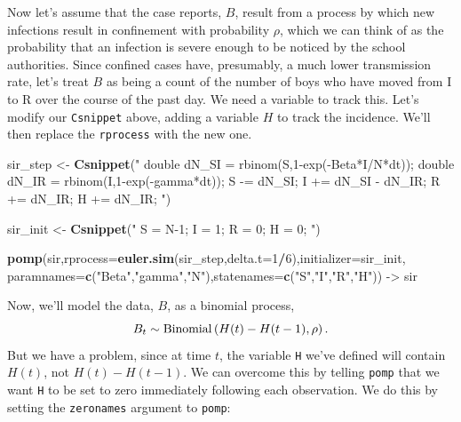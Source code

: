 \documentclass[]{article}
\newenvironment{Shaded}{\begin{snugshade}}{\end{snugshade}}
\newcommand{\KeywordTok}[1]{\textcolor[rgb]{0.13,0.29,0.53}{\textbf{#1}}}
\newcommand{\DataTypeTok}[1]{\textcolor[rgb]{0.13,0.29,0.53}{#1}}
\newcommand{\DecValTok}[1]{\textcolor[rgb]{0.00,0.00,0.81}{#1}}
\newcommand{\StringTok}[1]{\textcolor[rgb]{0.31,0.60,0.02}{#1}}
\newcommand{\OperatorTok}[1]{\textcolor[rgb]{0.81,0.36,0.00}{\textbf{#1}}}
\newcommand{\NormalTok}[1]{#1}
\begin{document}
Now let's assume that the case reports, \(B\), result from a process by
which new infections result in confinement with probability \(\rho\),
which we can think of as the probability that an infection is severe
enough to be noticed by the school authorities. Since confined cases
have, presumably, a much lower transmission rate, let's treat \(B\) as
being a count of the number of boys who have moved from I to R over the
course of the past day. We need a variable to track this. Let's modify
our \texttt{Csnippet} above, adding a variable \(H\) to track the
incidence. We'll then replace the \texttt{rprocess} with the new one.

\begin{Shaded}
\begin{Highlighting}[]
\NormalTok{sir_step <-}\StringTok{ }\KeywordTok{Csnippet}\NormalTok{(}\StringTok{"}
\StringTok{  double dN_SI = rbinom(S,1-exp(-Beta*I/N*dt));}
\StringTok{  double dN_IR = rbinom(I,1-exp(-gamma*dt));}
\StringTok{  S -= dN_SI;}
\StringTok{  I += dN_SI - dN_IR;}
\StringTok{  R += dN_IR;}
\StringTok{  H += dN_IR;}
\StringTok{"}\NormalTok{)}

\NormalTok{sir_init <-}\StringTok{ }\KeywordTok{Csnippet}\NormalTok{(}\StringTok{"}
\StringTok{  S = N-1;}
\StringTok{  I = 1;}
\StringTok{  R = 0;}
\StringTok{  H = 0;}
\StringTok{"}\NormalTok{)}

\KeywordTok{pomp}\NormalTok{(sir,}\DataTypeTok{rprocess=}\KeywordTok{euler.sim}\NormalTok{(sir_step,}\DataTypeTok{delta.t=}\DecValTok{1}\OperatorTok{/}\DecValTok{6}\NormalTok{),}\DataTypeTok{initializer=}\NormalTok{sir_init,}
     \DataTypeTok{paramnames=}\KeywordTok{c}\NormalTok{(}\StringTok{"Beta"}\NormalTok{,}\StringTok{"gamma"}\NormalTok{,}\StringTok{"N"}\NormalTok{),}\DataTypeTok{statenames=}\KeywordTok{c}\NormalTok{(}\StringTok{"S"}\NormalTok{,}\StringTok{"I"}\NormalTok{,}\StringTok{"R"}\NormalTok{,}\StringTok{"H"}\NormalTok{)) ->}\StringTok{ }\NormalTok{sir}
\end{Highlighting}
\end{Shaded}

Now, we'll model the data, \(B\), as a binomial process,
\[B_t \sim \mathrm{Binomial}\left(H(t)-H(t-1),\rho\right).\] But we have a problem,
since at time \(t\), the variable \texttt{H} we've defined will contain
\(H(t)\), not \(H(t)-H(t-1)\). We can overcome this by telling
\texttt{pomp} that we want \texttt{H} to be set to zero immediately
following each observation. We do this by setting the \texttt{zeronames}
argument to \texttt{pomp}:
\end{document}
